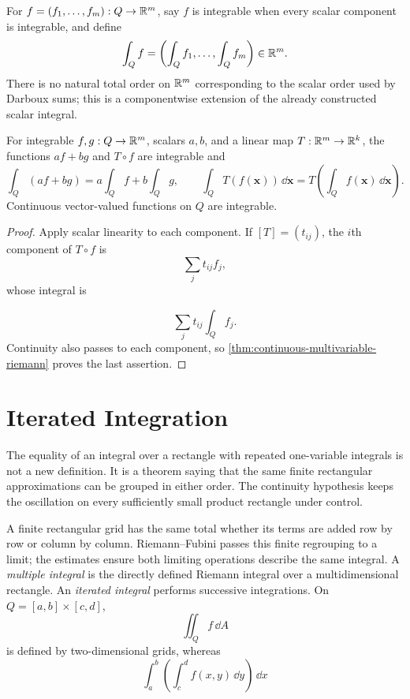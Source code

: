 \begin{definition}
For $f=(f_1,\ldots,f_m):Q\to\mathbb{R}^m$, say $f$ is integrable when every
scalar component is integrable, and define
\[
\int_Qf=\left(\int_Qf_1,\ldots,\int_Qf_m\right)\in\mathbb{R}^m.
\]
There is no natural total order on $\mathbb{R}^m$ corresponding to the scalar
order used by Darboux sums; this is a componentwise extension of the
already constructed scalar integral.
\end{definition}
\begin{proposition}
For integrable $f,g:Q\to\mathbb{R}^m$, scalars $a,b$, and a linear map
$T:\mathbb{R}^m\to\mathbb{R}^k$, the functions $af+bg$ and $T\circ f$ are integrable and
\[
\int_Q(af+bg)=a\int_Qf+b\int_Qg,\qquad
\int_QT(f(\mathbf{x}))\,\dd\mathbf{x}=T\left(\int_Qf(\mathbf{x})\,\dd\mathbf{x}\right).
\]
Continuous vector-valued functions on $Q$ are integrable.
\end{proposition}
\begin{proof}
Apply scalar linearity to each component. If $[T]=(t_{ij})$, the $i$th
component of $T\circ f$ is
\[
\sum_jt_{ij}f_j,
\]
 whose integral is

\[
\sum_jt_{ij}\int_Qf_j.
\]
 Continuity also passes to each component, so
\cref{thm:continuous-multivariable-riemann} proves the last assertion.
\end{proof}

\section{Iterated Integration}

The equality of an integral over a rectangle with repeated one-variable
integrals is not a new definition.  It is a theorem saying that the same
finite rectangular approximations can be grouped in either order.  The
continuity hypothesis keeps the oscillation on every sufficiently small
product rectangle under control.

\begin{center}
\end{center}
A finite rectangular grid has the same total whether its terms are added
row by row or column by column. Riemann--Fubini passes this finite
regrouping to a limit; the estimates ensure both limiting operations
describe the same integral.
A \emph{multiple integral} is the directly defined Riemann integral over
a multidimensional rectangle. An \emph{iterated integral} performs successive
integrations. On $Q=[a,b]\times[c,d]$,
\[
\iint_Qf\,\dd A
\]
 is defined
by two-dimensional grids, whereas
\[
\int_a^b(\int_c^df(x,y)\,\dd y)\,\dd x
\]

